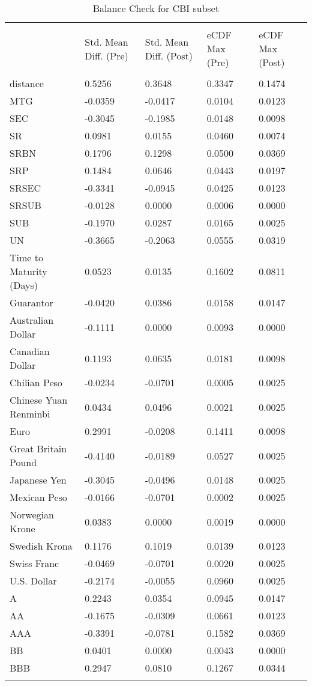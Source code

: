 \begin{table}[h!]
\centering
\scriptsize
\caption{Balance Check for CBI subset}
\begin{tabular}{lllll}
\\[-1.8ex]\hline 
\hline \\[-1.8ex] 
 & Std. Mean Diff. (Pre) & Std. Mean Diff. (Post) & eCDF Max (Pre) & eCDF Max (Post) \\
 \hline \\[-1.8ex] 
distance & 0.5256 & 0.3648 & 0.3347 & 0.1474 \\
MTG & -0.0359 & -0.0417 & 0.0104 & 0.0123 \\
SEC & -0.3045 & -0.1985 & 0.0148 & 0.0098 \\
SR & 0.0981 & 0.0155 & 0.0460 & 0.0074 \\
SRBN & 0.1796 & 0.1298 & 0.0500 & 0.0369 \\
SRP & 0.1484 & 0.0646 & 0.0443 & 0.0197 \\
SRSEC & -0.3341 & -0.0945 & 0.0425 & 0.0123 \\
SRSUB & -0.0128 & 0.0000 & 0.0006 & 0.0000 \\
SUB & -0.1970 & 0.0287 & 0.0165 & 0.0025 \\
UN & -0.3665 & -0.2063 & 0.0555 & 0.0319 \\
Time to Maturity (Days) & 0.0523 & 0.0135 & 0.1602 & 0.0811 \\
Guarantor & -0.0420 & 0.0386 & 0.0158 & 0.0147 \\
Australian Dollar & -0.1111 & 0.0000 & 0.0093 & 0.0000 \\
Canadian Dollar & 0.1193 & 0.0635 & 0.0181 & 0.0098 \\
Chilian Peso & -0.0234 & -0.0701 & 0.0005 & 0.0025 \\
Chinese Yuan Renminbi & 0.0434 & 0.0496 & 0.0021 & 0.0025 \\
Euro & 0.2991 & -0.0208 & 0.1411 & 0.0098 \\
Great Britain Pound & -0.4140 & -0.0189 & 0.0527 & 0.0025 \\
Japanese Yen & -0.3045 & -0.0496 & 0.0148 & 0.0025 \\
Mexican Peso & -0.0166 & -0.0701 & 0.0002 & 0.0025 \\
Norwegian Krone & 0.0383 & 0.0000 & 0.0019 & 0.0000 \\
Swedish Krona & 0.1176 & 0.1019 & 0.0139 & 0.0123 \\
Swiss Franc & -0.0469 & -0.0701 & 0.0020 & 0.0025 \\
U.S. Dollar & -0.2174 & -0.0055 & 0.0960 & 0.0025 \\
A & 0.2243 & 0.0354 & 0.0945 & 0.0147 \\
AA & -0.1675 & -0.0309 & 0.0661 & 0.0123 \\
AAA & -0.3391 & -0.0781 & 0.1582 & 0.0369 \\
BB & 0.0401 & 0.0000 & 0.0043 & 0.0000 \\
BBB & 0.2947 & 0.0810 & 0.1267 & 0.0344 \\
\hline \\[-1.8ex] 
\end{tabular}
\end{table}

